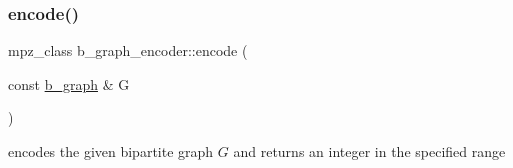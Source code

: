 \mbox{\label{classb__graph__encoder_a9dbf40f42a2eb12822b14ca10d580763}} 
\subsubsection{\texorpdfstring{encode()}{encode()}}
{\footnotesize\ttfamily mpz\+\_\+class b\+\_\+graph\+\_\+encoder\+::encode (\begin{DoxyParamCaption}\item[{const \hyperlink{classb__graph}{b\+\_\+graph} \&}]{G }\end{DoxyParamCaption})}



encodes the given bipartite graph $G$ and returns an integer in the specified range 


